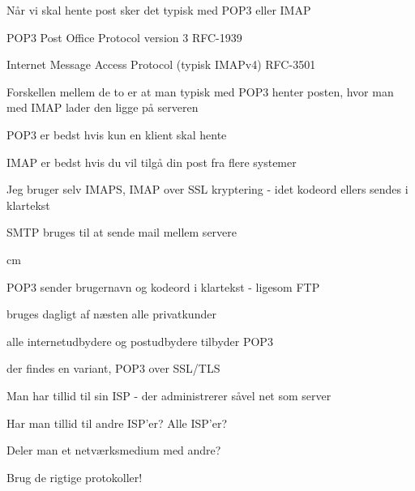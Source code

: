 \documentclass[20pt,landscape,a4paper,footrule]{foils}
\begin{document}
\begin{list1}
\item Når vi skal hente post sker det typisk med POP3 eller IMAP
\begin{list2}
\item POP3 Post Office Protocol version 3 RFC-1939
\item Internet Message Access Protocol (typisk IMAPv4) RFC-3501
\end{list2}
\item Forskellen mellem de to er at man typisk med POP3 henter posten, hvor man med IMAP lader den ligge på serveren
\item POP3 er bedst hvis kun en klient skal hente
\item IMAP er bedst hvis du vil tilgå din post fra flere systemer
\item Jeg bruger selv IMAPS, IMAP over SSL kryptering - idet kodeord ellers sendes i klartekst
\item SMTP bruges til at sende mail mellem servere
\end{list1}


 cm

\begin{list1}
\item POP3 sender brugernavn og kodeord i klartekst - ligesom FTP
\item bruges dagligt af næsten alle privatkunder
\item  alle internetudbydere og postudbydere tilbyder POP3
\item der findes en variant, POP3 over SSL/TLS
\end{list1}




\begin{list1}
\item Man har tillid til sin ISP - der administrerer såvel net som server
\end{list1}


\begin{list1}
\item Har man tillid til andre ISP'er? Alle ISP'er?
\item Deler man et netværksmedium med andre?
\item {\color{green}Brug de rigtige protokoller!}
\end{list1}
\end{document}
